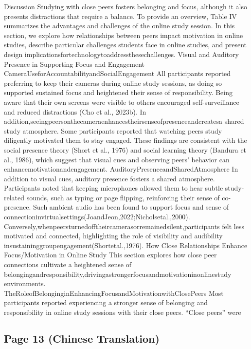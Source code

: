 \documentclass[12pt]{ctexart}
\begin{document}
Discussion
Studying with close peers fosters belonging and focus, although it also presents
distractions that require a balance. To provide an overview, Table IV summarizes
the advantages and challenges of the online study session. In this section, we
explore how relationships between peers impact motivation in online studies,
describe particular challenges students face in online studies, and present design
implicationsfortechnologytoaddressthesechallenges.
Visual and Auditory Presence in Supporting Focus and Engagement
CameraUseforAccountabilityandSocialEngagement
All participants reported preferring to keep their cameras during online study
sessions, as doing so supported sustained focus and heightened their sense of
responsibility. Being aware that their own screens were visible to others
encouraged self-surveillance and reduced distractions (Cho et al., 2023b). In
addition,seeingpeersonthecameraenhancestheirsenseofpresenceandcreatesa
shared study atmosphere. Some participants reported that watching peers study
diligently motivated them to stay engaged. These findings are consistent with the
social presence theory (Short et al., 1976) and social learning theory (Bandura
et al., 1986), which suggest that visual cues and observing peers’ behavior can
enhancemotivationandengagement.
AuditoryPresenceandSharedAtmosphere
In addition to visual cues, auditory presence fosters a shared atmosphere.
Participants noted that keeping microphones allowed them to hear subtle
study-related sounds, such as typing or page flipping, reinforcing their sense of
co-presence. Such ambient audio has been found to support focus and sense of
connectioninvirtualsettings(JoandJeon,2022;Nicholsetal.,2000).
Conversely,whenpeersturnedofftheircamerasorremainedsilent,participants
felt less motivated and connected, highlighting the role of visibility and audibility
insustaininggroupengagement(Shortetal.,1976).
How Close Relationships Enhance Focus/Motivation in Online Study
This section explores how close peer connections cultivate a heightened sense of
belongingandresponsibility,drivingastrongerfocusandmotivationinonlinestudy
environments.
TheRoleofBelonginginEnhancingFocusandMotivationwithClosePeers
Most participants reported experiencing a stronger sense of belonging and
responsibility in online study sessions with their close peers. “Close peers” were

\subsection*{Page 13 (Chinese Translation)}
\end{document}
